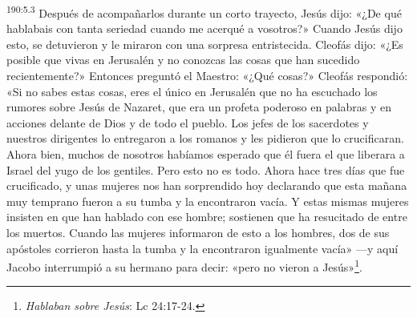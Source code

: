 \par 
\textsuperscript{190:5.3} Después de acompañarlos durante un corto trayecto, Jesús dijo: «¿De qué hablabais con tanta seriedad cuando me acerqué a vosotros?» Cuando Jesús dijo esto, se detuvieron y le miraron con una sorpresa entristecida. Cleofás dijo: «¿Es posible que vivas en Jerusalén y no conozcas las cosas que han sucedido recientemente?» Entonces preguntó el Maestro: «¿Qué cosas?» Cleofás respondió: «Si no sabes estas cosas, eres el único en Jerusalén que no ha escuchado los rumores sobre Jesús de Nazaret, que era un profeta poderoso en palabras y en acciones delante de Dios y de todo el pueblo. Los jefes de los sacerdotes y nuestros dirigentes lo entregaron a los romanos y les pidieron que lo crucificaran. Ahora bien, muchos de nosotros habíamos esperado que él fuera el que liberara a Israel del yugo de los gentiles. Pero esto no es todo. Ahora hace tres días que fue crucificado, y unas mujeres nos han sorprendido hoy declarando que esta mañana muy temprano fueron a su tumba y la encontraron vacía. Y estas mismas mujeres insisten en que han hablado con ese hombre; sostienen que ha resucitado de entre los muertos. Cuando las mujeres informaron de esto a los hombres, dos de sus apóstoles corrieron hasta la tumba y la encontraron igualmente vacía» ---y aquí Jacobo interrumpió a su hermano para decir: «pero no vieron a Jesús»\footnote{\textit{Hablaban sobre Jesús}: Lc 24:17-24.}.

